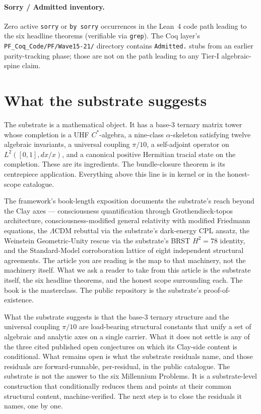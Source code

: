 \documentclass[11pt,a4paper]{amsart}
\theoremstyle{plain}
\theoremstyle{definition}
\begin{document}
\paragraph{Sorry / Admitted inventory.} Zero active \texttt{sorry} or \texttt{by sorry} occurrences in the Lean~4 code path leading to the six headline theorems (verifiable via \texttt{grep}). The Coq layer's \texttt{PF\_Coq\_Code/PF/Wave15-21/} directory contains \texttt{Admitted.} stubs from an earlier parity-tracking phase; those are not on the path leading to any Tier-I algebraic-spine claim.

\section{What the substrate suggests}\label{sec:conclusion}

The substrate is a mathematical object. It has a base-3 ternary matrix tower whose completion is a UHF $C^*$-algebra, a nine-class $\alpha$-skeleton satisfying twelve algebraic invariants, a universal coupling $\pi/10$, a self-adjoint operator on $L^2([0,1], dx/x)$, and a canonical positive Hermitian tracial state on the completion. These are its ingredients. The bundle-closure theorem is its centrepiece application. Everything above this line is in kernel or in the honest-scope catalogue.

The framework's book-length exposition documents the substrate's reach beyond the Clay axes --- consciousness quantification through Grothendieck-topos architecture, consciousness-modified general relativity with modified Friedmann equations, the $\Lambda$CDM rebuttal via the substrate's dark-energy CPL ansatz, the Weinstein Geometric-Unity rescue via the substrate's BRST $H^2 = 78$ identity, and the Standard-Model corroboration lattice of eight independent structural agreements. The article you are reading is the map to that machinery, not the machinery itself. What we ask a reader to take from this article is the substrate itself, the six headline theorems, and the honest scope surrounding each. The book is the masterclass. The public repository is the substrate's proof-of-existence.

What the substrate suggests is that the base-3 ternary structure and the universal coupling $\pi/10$ are load-bearing structural constants that unify a set of algebraic and analytic axes on a single carrier. What it does not settle is any of the three cited published open conjectures on which its Clay-side content is conditional. What remains open is what the substrate residuals name, and those residuals are forward-runnable, per-residual, in the public catalogue. The substrate is not the answer to the six Millennium Problems. It is a substrate-level construction that conditionally reduces them and points at their common structural content, machine-verified. The next step is to close the residuals it names, one by one.
\end{document}
